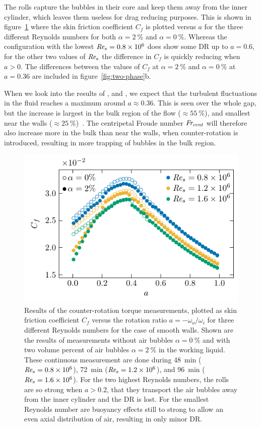 \documentclass[aps,twocolumn,10pt,floatfix, superscriptaddress,longbibliography,pra]{revtex4-1}
\newcommand\Rey{\mbox{\textit{Re$_s$}}}  %
\newcommand\Frcent{\mbox{\textit{Fr$_\text{cent}$}}}  %
\newcommand{\perc}[1]{ \SI{#1}{\percent} }
\newcommand{\e}[1]{\times 10^{#1}}
\begin{document}
The rolls capture the bubbles in their core and keep them away from the inner cylinder, which leaves them useless for drag reducing purposes. This is shown in figure~\ref{fig:asweep} where the skin friction coefficient $C_f$ is plotted versus $a$ for the three different Reynolds numbers for both $\alpha = \perc{2}$ and $\alpha = \perc{0}$. Whereas the configuration with the lowest $\Rey = 0.8\e{6}$ does show some DR up to $a = 0.6$, for the other two values of $\Rey$ the difference in $C_f$ is quickly reducing when $a > 0$. The differences between the values of $C_f$ at $\alpha = \perc{2}$ and $\alpha = \perc{0}$ at $a=0.36$ are included in figure~\ref{fig:two-phase}b.

When we look into the results of \cite{Dong2008}, and \cite{Huisman2014}, we expect that the turbulent fluctuations in the fluid reaches a maximum around $a \approx 0.36$. This is seen over the whole gap, but the increase is largest in the bulk region of the flow ($\approx \SI{55}{\percent}$), and smallest near the walls ($\approx \SI{25}{\percent}$)~\citep{Dong2008}. The centripetal Froude number $\Frcent$ will therefore also increase more in the bulk than near the walls, when counter-rotation is introduced, resulting in more trapping of bubbles in the bulk region.

\begin{figure}
    \includegraphics[scale=1]{./figures/fig8_counterrotation}
    \caption{Results of the counter-rotation torque measurements, plotted as skin friction coefficient $C_f$ versus the rotation ratio $a = -\omega_o / \omega_i$ for three different Reynolds numbers for the case of smooth walls. Shown are the results of measurements without air bubbles $\alpha = \perc{0}$ and with two volume percent of air bubbles $\alpha = \perc{2}$ in the working liquid. These continuous measurement are done during \SI{48}{\minute} ($\Rey=0.8\times10^6$), \SI{72}{\minute} ($\Rey=1.2\times10^6$), and \SI{96}{\minute} ($\Rey=1.6\times10^6$). For the two highest Reynolds numbers, the rolls are so strong when $a>0.2$, that they transport the air bubbles away from the inner cylinder and the DR is lost. For the smallest Reynolds number are buoyancy effects still to strong to allow an even axial distribution of air, resulting in only minor DR.} \label{fig:asweep}
\end{figure}
\end{document}
